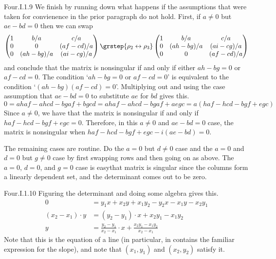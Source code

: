\begin{ans}{Four.I.1.9}
      We finish by running down what happens if the assumptions that were
      taken for convienence in the prior paragraph do not hold.
      First, if \( a\neq 0 \) but \( ae-bd=0 \) then we can swap
      \begin{equation*}
        \begin{pmatrix}
           1   &b/a           &c/a           \\
           0   &0             &(af-cd)/a     \\
           0   &(ah-bg)/a     &(ai-cg)/a
         \end{pmatrix}
        \grstep{\rho_2\leftrightarrow\rho_3}
        \begin{pmatrix}
           1   &b/a           &c/a           \\
           0   &(ah-bg)/a     &(ai-cg)/a     \\
           0   &0             &(af-cd)/a
         \end{pmatrix}
      \end{equation*}
      and conclude that the matrix is nonsingular if and only if either
      \( ah-bg=0 \) or \( af-cd=0 \).
      The condition `\( ah-bg=0 \) or \( af-cd=0 \)' is equivalent to
      the condition `\( (ah-bg)(af-cd)=0 \)'.
      Multiplying out and using the case assumption that $ae-bd=0$
      to substitute $ae$ for $bd$ gives this.
      \begin{equation*}
         0=ahaf-ahcd-bgaf+bgcd
          =ahaf-ahcd-bgaf+aegc
          =a(haf-hcd-bgf+egc)
      \end{equation*}
      Since \( a\neq 0 \), we have that the matrix
      is nonsingular if and only if \( haf-hcd-bgf+egc=0 \).
      Therefore, in this \( a\neq 0 \) and \( ae-bd=0 \) case,
      the matrix is nonsingular when
      \( haf-hcd-bgf+egc-i(ae-bd)=0 \).

      The remaining cases are routine.
      Do the \( a=0 \) but \( d\neq 0 \) case and the \( a=0 \) and \( d=0 \)
      but \( g\neq 0 \) case by first swapping rows and then going on as
      above.
      The \( a=0 \), \( d=0 \), and \( g=0 \) case is easy\Dash that matrix is
      singular since the columns form a linearly dependent set, and the
      determinant comes out to be zero.
    
\end{ans}
\begin{ans}{Four.I.1.10}
       Figuring the determinant and doing some algebra gives this.
       \begin{align*}
          0
          &=y_1x+x_2y+x_1y_2-y_2x-x_1y-x_2y_1     \\
          (x_2-x_1)\cdot y
          &=(y_2-y_1)\cdot x+x_2y_1-x_1y_2              \\
          y
          &=\frac{y_2-y_1}{x_2-x_1}\cdot x+\frac{x_2y_1-x_1y_2}{x_2-x_1}
       \end{align*}
       Note that this is the equation of a line (in particular,
       in contains the familiar expression for the slope),
       and note that \( (x_1,y_1) \)  and \( (x_2,y_2) \) satisfy it.
     
\end{ans}
